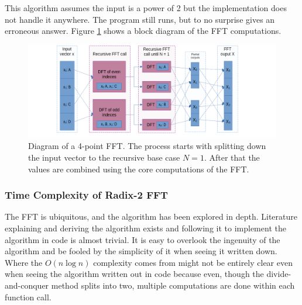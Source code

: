 


This algorithm assumes the input is a power of 2 but the implementation does not handle it anywhere. The program still runs, but to no surprise gives an erroneous answer. Figure \ref{fig:FFT-Alg} shows a block diagram of the FFT computations.

\begin{figure}[ht]
    \centering
    \includegraphics[width=\textwidth]{./images/fft.png}
    \caption{Diagram of a 4-point FFT. The process starts with splitting down the input vector to the recursive base case $N=1$. After that the values are combined using the core computations of the FFT.\label{fig:FFT-Alg}}
\end{figure}

\subsubsection{Time Complexity of Radix-2 FFT}
The FFT is ubiquitous, and the algorithm has been explored in depth. Literature explaining and deriving the algorithm exists and following it to implement the algorithm in code is almost trivial. It is easy to overlook the ingenuity of the algorithm and be fooled by the simplicity of it when seeing it written down. Where the $O(n\log n)$ complexity comes from might not be entirely clear even when seeing the algorithm written out in code because even, though the divide-and-conquer method splits into two, multiple computations are done within each function call. 

